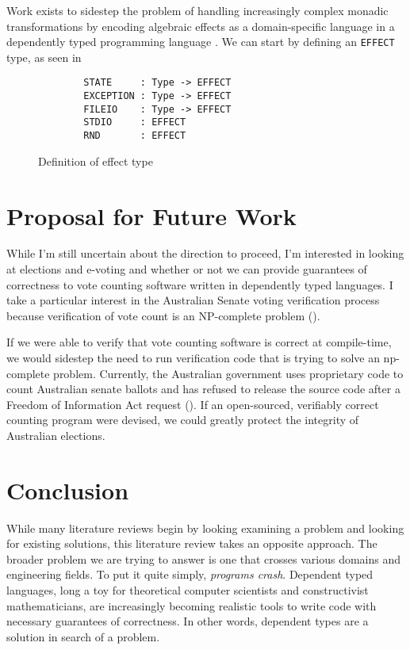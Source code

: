 Work exists to sidestep the problem of handling increasingly complex monadic transformations by encoding algebraic effects as a domain-specific language in a dependently typed programming language \cite{algebraic}. We can start by defining an \texttt{EFFECT} type, as seen in 

\begin{figure}
    \caption{Definition of effect type}
    \label{effects_def}
    \begin{lstlisting}
        STATE     : Type -> EFFECT
        EXCEPTION : Type -> EFFECT
        FILEIO    : Type -> EFFECT
        STDIO     : EFFECT
        RND       : EFFECT
    \end{lstlisting}
\end{figure}

\section{Proposal for Future Work}

While I'm still uncertain about the direction to proceed, I'm interested in
looking at elections and e-voting and whether or not we can provide guarantees
of correctness to vote counting software written in dependently typed languages.
I take a particular interest in the Australian Senate voting verification
process because verification of vote count is an NP-complete problem
(\cite{aus_senate}). 

If we were able to verify that vote counting software is correct at
compile-time, we would sidestep the need to run verification code that is trying
to solve an np-complete problem. Currently, the Australian government uses
proprietary code to count Australian senate ballots and has refused to release
the source code after a Freedom of Information Act request
(\cite{aus_senate_news}). If an open-sourced, verifiably correct counting
program were devised, we could greatly protect the integrity of Australian
elections. 

\section{Conclusion}
While many literature reviews begin by looking examining a problem and looking
for existing solutions, this literature review takes an opposite approach. The
broader problem we are trying to answer is one that crosses various domains and
engineering fields. To put it quite simply, \textit{programs crash}. Dependent
typed languages, long a toy for theoretical computer scientists and
constructivist mathematicians, are increasingly becoming realistic tools to
write code with necessary guarantees of correctness. In other words, dependent
types are a solution in search of a problem. 

